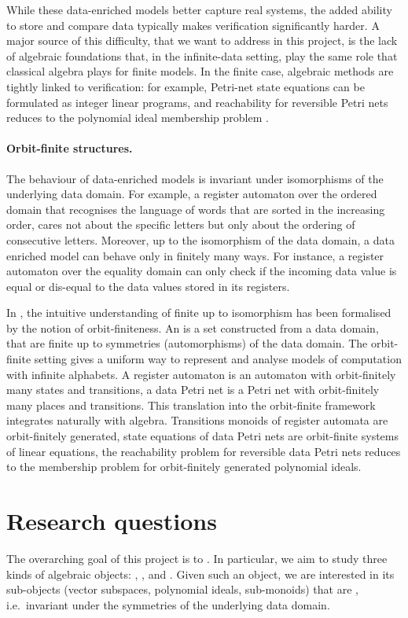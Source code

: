 \documentclass[a4paper,11pt]{article}
\begin{document}
While these data-enriched models better capture real systems, the added ability to store and compare data typically makes verification significantly harder.
A major source of this difficulty,
that we want to address in this project,
is the lack of algebraic foundations that,
in the infinite-data setting, play the same role that classical algebra plays for finite models.
In the finite case, algebraic methods are tightly linked to verification:
for example, Petri-net state equations can be formulated as integer linear programs,
and reachability for reversible Petri nets reduces to the polynomial ideal membership problem \cite{MM82}.
%
\paragraph*{Orbit-finite structures.}
The behaviour of data-enriched models is invariant under isomorphisms of the underlying data domain.
For example, a register automaton over the ordered domain that recognises the language of words that are sorted in the increasing order,
cares not about the specific letters but only about the ordering of consecutive letters.
Moreover, up to the isomorphism of the data domain, a data enriched model can behave only in finitely many ways.
For instance, a register automaton over the equality domain can only check if the incoming data value is equal or dis-equal to the data values stored in its registers.

In \cite{BKL14}, the intuitive understanding of finite up to isomorphism has been formalised by the notion of orbit-finiteness.
An  is a set constructed from a data domain, that are finite up to symmetries (automorphisms) of the data domain.
The orbit-finite setting gives a uniform way to represent and analyse models of computation with infinite alphabets.
A register automaton is an automaton with orbit-finitely many states and transitions,
a data Petri net is a Petri net with orbit-finitely many places and transitions. This translation into the orbit-finite framework integrates naturally with algebra.
Transitions monoids of register automata are orbit-finitely generated,
state equations of data Petri nets are orbit-finite systems of linear equations,
the reachability problem for reversible data Petri nets reduces to the membership problem for orbit-finitely generated polynomial ideals.
%
\section{Research questions}
%
The overarching goal of this project is to .
In particular,
we aim to study three kinds of algebraic objects:
,
,
and .
Given such an object, we are interested in its sub-objects (vector subspaces, polynomial ideals, sub-monoids) that are ,
i.e.\ invariant under the symmetries of the underlying data domain.
\end{document}
